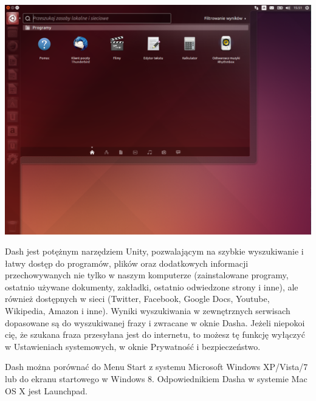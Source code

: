 \begin{center}
	\includegraphics[width=\linewidth]{images/unity_pulpit_dash.png}
\end{center}

Dash jest potężnym narzędziem Unity, pozwalającym na szybkie wyszukiwanie i łatwy dostęp do programów, plików oraz dodatkowych informacji przechowywanych nie tylko w naszym komputerze (zainstalowane programy, ostatnio używane dokumenty, zakładki, ostatnio odwiedzone strony i inne), ale również dostępnych w sieci (Twitter, Facebook, Google Docs, Youtube, Wikipedia, Amazon i inne). Wyniki wyszukiwania w zewnętrznych serwisach dopasowane są do wyszukiwanej frazy i zwracane w oknie Dasha. Jeżeli niepokoi cię, że szukana fraza przesyłana jest do internetu, to możesz tę funkcję wyłączyć w Ustawieniach systemowych, w oknie \textcolor{ubuntu_orange}{Prywatność i bezpieczeństwo}.

Dash można porównać do Menu Start z systemu Microsoft Windows XP/Vista/7 lub do ekranu startowego w Windows 8. Odpowiednikiem Dasha w systemie Mac OS X jest Launchpad.

